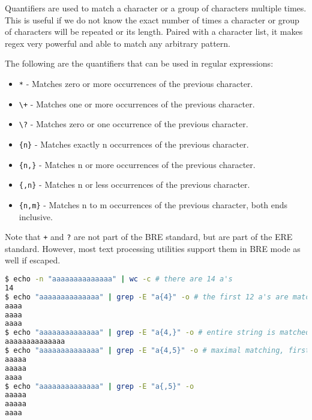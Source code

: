 Quantifiers are used to match a character or a group of characters multiple times.
This is useful if we do not know the exact number of times a character or group of characters will be repeated or its length. Paired with a character list, it makes
regex very powerful and able to match any arbitrary pattern.

The following are the quantifiers that can be used in regular expressions:

\begin{itemize}
  \item \lstinline|*| - Matches zero or more occurrences of the previous character.
  \item \lstinline|\+| - Matches one or more occurrences of the previous character.
  \item \lstinline|\?| - Matches zero or one occurrence of the previous character.
  \item \lstinline|{n}| - Matches exactly n occurrences of the previous character.
  \item \lstinline|{n,}| - Matches n or more occurrences of the previous character.
  \item \lstinline|{,n}| - Matches n or less occurrences of the previous character.
  \item \lstinline|{n,m}| - Matches n to m occurrences of the previous character, both ends inclusive.
\end{itemize}

Note that \lstinline|+| and \lstinline|?| are not part of the BRE standard, but are part of the ERE standard. However, most text processing utilities support them in BRE mode as well if escaped.

\begin{lstlisting}[language=bash]
$ echo -n "aaaaaaaaaaaaaa" | wc -c # there are 14 a's
14
$ echo "aaaaaaaaaaaaaa" | grep -E "a{4}" -o # the first 12 a's are matched in groups of four
aaaa
aaaa
aaaa
$ echo "aaaaaaaaaaaaaa" | grep -E "a{4,}" -o # entire string is matched
aaaaaaaaaaaaaa
$ echo "aaaaaaaaaaaaaa" | grep -E "a{4,5}" -o # maximal matching, first 10 a's are matched as groups of 5, then the last 4 a's are matched as group of four.
aaaaa
aaaaa
aaaa
$ echo "aaaaaaaaaaaaaa" | grep -E "a{,5}" -o
aaaaa
aaaaa
aaaa
\end{lstlisting}


